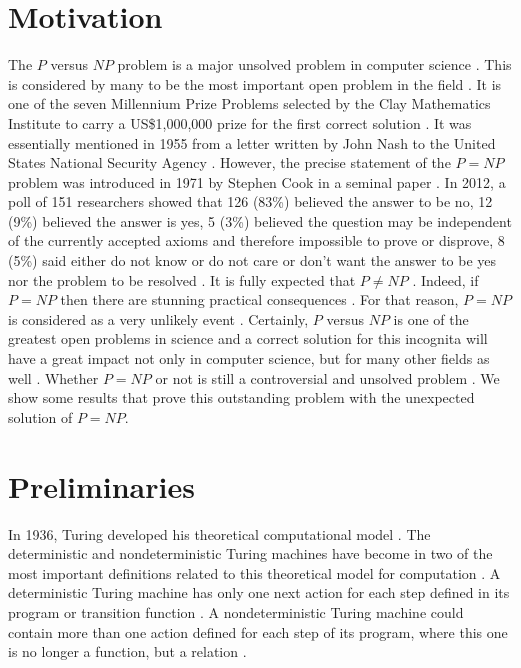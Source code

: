 \documentclass[a4paper,UKenglish,cleveref, autoref]{lipics-v2019}
\begin{document}
\section{Motivation}

The $P$ versus $NP$ problem is a major unsolved problem in computer science \cite{CS00}. This is considered by many to be the most important open problem in the field \cite{CS00}. It is one of the seven Millennium Prize Problems selected by the Clay Mathematics Institute to carry a US\$1,000,000 prize for the first correct solution \cite{CS00}. It was essentially mentioned in 1955 from a letter written by John Nash to the United States National Security Agency \cite{AS17}. However, the precise statement of the $P=NP$ problem was introduced in 1971 by Stephen Cook in a seminal paper \cite{CS00}. In 2012, a poll of 151 researchers showed that 126 (83\%) believed the answer to be no, 12 (9\%) believed the answer is yes, 5 (3\%) believed the question may be independent of the currently accepted axioms and therefore impossible to prove or disprove, 8 (5\%) said either do not know or do not care or don't want the answer to be yes nor the problem to be resolved \cite{GA12}. It is fully expected that $P \neq NP$ \cite{Pap03}. Indeed, if $P = NP$ then there are stunning practical consequences \cite{Pap03}. For that reason, $P = NP$ is considered as a very unlikely event \cite{Pap03}. Certainly, $P$ versus $NP$ is one of the greatest open problems in science and a correct solution for this incognita will have a great impact not only in computer science, but for many other fields as well \cite{AS17}. Whether $P = NP$ or not is still a controversial and unsolved problem \cite{AS17}. We show some results that prove this outstanding problem with the unexpected solution of $P = NP$.

\section{Preliminaries}

In 1936, Turing developed his theoretical computational model \cite{MS06}. The deterministic and nondeterministic Turing machines have become in two of the most important definitions related to this theoretical model for computation \cite{MS06}. A deterministic Turing machine has only one next action for each step defined in its program or transition function \cite{MS06}. A nondeterministic Turing machine could contain more than one action defined for each step of its program, where this one is no longer a function, but a relation \cite{MS06}.
\end{document}
